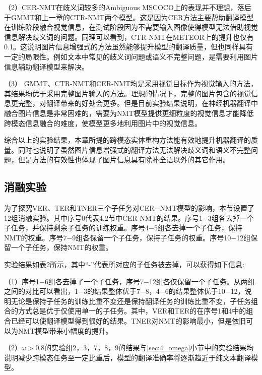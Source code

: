 （2）CER-NMT在歧义词较多的Ambiguous MSCOCO上的表现并不理想，落后于GMMT和上一章的CTR-NMT两个模型。这是因为CER方法主要帮助翻译模型在训练阶段融合视觉信息，在测试阶段因为不需要输入图像使得模型无法借助视觉信息解决歧义词的问题。同理可以看到，CTR-NMT在METEOR上的提升也仅有0.1。这说明图片信息增强式的方法虽然能够提升模型的翻译质量，但也同样具有一定的局限性。例如文本中常见的歧义词问题或语义不完整问题，是需要利用图片信息辅助翻译模型来解决。

（3）%
GMMT、CTR-NMT和CER-NMT均是采用视觉目标作为视觉输入的方法，其结果均优于采用完整图片输入的方法。理想的情况下，完整的图片包含的视觉信息更完整，对翻译带来的好处会更多。但是目前实验结果说明，在神经机器翻译中融合图片信息是非常困难的，需要为NMT模型提供更细粒度的视觉信息才能降低跨模态信息融合的难度，使模型更多地利用图片中的视觉信息。

综合以上的实验结果，本章所提的跨模态实体重构方法能有效地提升机器翻译的质量。同时也说明了虽然图片信息增强式的翻译方法无法解决歧义词和语义不完整问题，但是方法的有效性也体现了图片信息具有除补全语以外的其它作用。

\subsection{消融实验}
\label{sec:4_ablation_study}
为了探究VER、TER和TNER三个子任务对CER$-$NMT模型的影响，本节设置了12组消融实验。其中序号0代表4.2节中CER-NMT的结果。序号1$-$3组各去掉一个子任务，并保持剩余子任务的训练权重。序号4$-$5组各去掉一个子任务，保持NMT的权重。序号7$-$9组各保留一个子任务，保持子任务的权重。序号10$-$12组保留一个子任务，保持NMT的权重。


实验结果如表2所示，其中“-”代表所对应的子任务被去掉，可以获得如下信息:

（1）序号1$-$6组各去掉了一个子任务，序号7$-$12组各仅保留一个子任务。从两组之间的对比可以看出，1$-$3的结果整体优于7$-$8，4$-$6的结果整体优于10$-$12，说明无论是保持子任务的训练比重不变还是保持翻译任务的训练比重不变，子任务组合的方式总是优于仅使用单一的子任务。其中，VER和TER的在序号1和4中的组合已经可以使翻译模型得到很好的结果。TNER对NMT的影响最小，但是依旧可以为NMT模型带来小幅度的提升。

（2）$\omega>0.8$的实验组2，3，7，8，9的结果与\ref{sec:4_omega}小节中的实验结果均说明减少跨模态任务至一定比重后，模型的翻译准确率将逐渐趋近于纯文本翻译模型。

